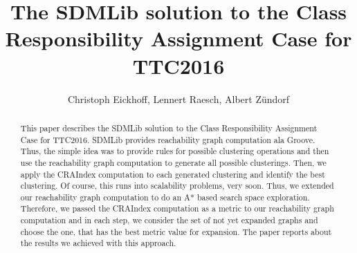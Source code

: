 \documentclass[submission,copyright,creativecommons]{eptcs}
\begin{document}





\pagestyle{headings}

\title{The SDMLib solution to the Class Responsibility Assignment Case for TTC2016} 
\author{Christoph Eickhoff, Lennert Raesch, Albert Z{\"u}ndorf
}

\def\authorrunning{ Albert Z{\"u}ndorf}
\def\titlerunning{The SDMLib solution for TTC2016}

\maketitle

\begin{abstract}

This paper describes the SDMLib solution to the Class Responsibility Assignment Case 
for TTC2016. SDMLib provides reachability graph computation ala Groove. Thus, 
the simple idea was to provide rules for possible clustering operations and then use the
reachability graph computation to generate all possible clusterings. Then, we apply the
CRAIndex computation to each generated clustering and identify the best clustering. Of course,
this runs into scalability problems, very soon. Thus, we extended our reachability graph 
computation to do an A* based search space exploration. Therefore, we passed the CRAIndex 
computation as a metric to our reachability graph computation and in each step, we consider 
the set of not yet expanded graphs and choose the one, that has the best metric value for 
expansion. The paper reports about the results we achieved with this approach.  
   
  
\end{abstract}
\end{document}

